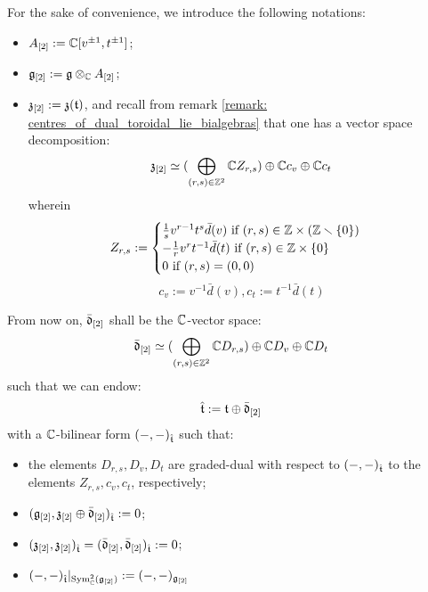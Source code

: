             \begin{convention} 
                For the sake of convenience, we introduce the following notations:
                \begin{itemize}
                    \item $A_{[2]} := \mathbb{C}[v^{\pm 1}, t^{\pm 1}]$;
                    \item $\g_{[2]} := \g \tensor_{\bbC} A_{[2]}$;
                    \item $\mathfrak{z}_{[2]} := \mathfrak{z}(\mathfrak{t})$, and recall from remark \ref{remark: centres_of_dual_toroidal_lie_bialgebras} that one has a vector space decomposition:
                        $$\mathfrak{z}_{[2]} \simeq ( \bigoplus_{(r, s) \in \mathbb{Z}^2} \mathbb{C} Z_{r, s} ) \oplus \mathbb{C} c_v \oplus \mathbb{C} c_t$$
                    wherein
                        $$
                            Z_{r, s} :=
                            \begin{cases}
                                \text{$\frac1s v^{r - 1} t^s \bar{d}(v)$ if $(r, s) \in \Z \x (\Z \setminus \{0\})$}
                                \\
                                \text{$-\frac1r v^r t^{-1} \bar{d}(t)$ if $(r, s) \in \Z \x \{0\}$}
                                \\
                                \text{$0$ if $(r, s) = (0, 0)$}
                            \end{cases}
                        $$
                        $$c_v := v^{-1} \bar{d}(v), c_t := t^{-1} \bar{d}(t)$$
                \end{itemize}
            \end{convention}
            \begin{convention} \label{conv: orthogonal_complement_of_toroidal_centres}
                From now on, $\bar{\mathfrak{d}}_{[2]}$ shall be the $\mathbb{C}$-vector space:
                    $$\bar{\mathfrak{d}}_{[2]} \simeq ( \bigoplus_{(r, s) \in \mathbb{Z}^2} \mathbb{C} D_{r, s} ) \oplus \mathbb{C} D_v \oplus \mathbb{C} D_t$$
                such that we can endow:
                    $$\hat{\mathfrak{t}} := \mathfrak{t} \oplus \bar{\mathfrak{d}}_{[2]}$$
                with a $\mathbb{C}$-bilinear form $(-, -)_{\hat{\mathfrak{t}}}$ such that:
                \begin{itemize}
                    \item the elements $D_{r, s}, D_v, D_t$ are graded-dual with respect to $(-, -)_{\hat{\mathfrak{t}}}$ to the elements $Z_{r, s}, c_v, c_t$, respectively;
                    \item $(\mathfrak{g}_{[2]}, \mathfrak{z}_{[2]} \oplus \bar{\mathfrak{d}}_{[2]})_{\hat{\mathfrak{t}}} := 0$;
                    \item $(\mathfrak{z}_{[2]}, \mathfrak{z}_{[2]})_{\hat{\mathfrak{t}}} = (\bar{\mathfrak{d}}_{[2]}, \bar{\mathfrak{d}}_{[2]})_{\hat{\mathfrak{t}}} := 0$;
                    \item $(-, -)_{\hat{\mathfrak{t}}}|_{\mathrm{Sym}^2_{\mathbb{C}}(\mathfrak{g}_{[2]})} := (-, -)_{\mathfrak{g}_{[2]}}$
                \end{itemize}
            \end{convention}
